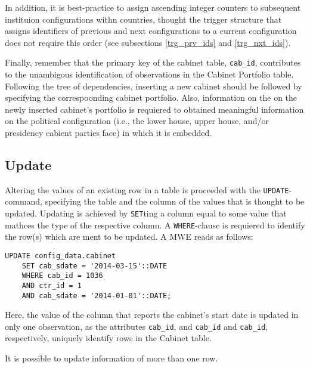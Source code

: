 In addition, it is best-practice to assign ascending integer counters  to subsequent instituion configurations withn countries, thought the trigger structure that assigns identifiers of previous and next configurations to a current configuration does not require this order (see subsections \ref{trg_prv_ids} and \ref{trg_nxt_ids}).

Finally, remember that the primary key of the cabinet table, \texttt{\footnotesize cab\_id}, contributes to the unambigous identification of observations in the Cabinet Portfolio table. Following the tree of dependencies, inserting a new cabinet should be followed by specifying the correspoonding cabinet portfolio.
Also, information on the on the newly inserted cabinet's portfolio is requiered to obtained meaningful information on the political configuration (i.e., the lower house, upper house, and/or presidency cabient parties face) in which it is embedded.

\subsection{Update}

Altering the values of an existing row in a table is proceeded with the \texttt{\footnotesize UPDATE}-command, specifying the table and the column of the values that is thought to be updated. 
Updating is achieved by \texttt{\footnotesize SET}ting a column equal to some value that mathces the type of the respective column.
A \texttt{\footnotesize WHERE}-clause is requiered to identify the row(s) which are ment to be updated.
A MWE reads as follows:

\begin{lstlisting}[language=postgreSQL]
UPDATE config_data.cabinet 
	SET cab_sdate = '2014-03-15'::DATE 
	WHERE cab_id = 1036 
	AND ctr_id = 1 
	AND cab_sdate = '2014-01-01'::DATE;
\end{lstlisting}

Here, the value of the column that reports the cabinet's start date is updated in only one observation, as the attributes \texttt{\footnotesize cab\_id}, and \texttt{\footnotesize cab\_id} and \texttt{\footnotesize cab\_id}, respectively, uniquely identify rows in the Cabinet table.

It is possible to update information of more than one row.


